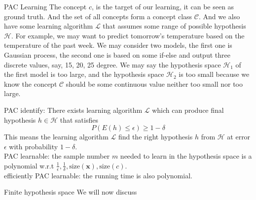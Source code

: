 \documentclass{beamer}
\newcommand{\x}{\mathbf{x}}
\begin{document}
\begin{frame}[allowframebreaks]{PAC Learning}
The concept $c$, is the target of our learning, it can be seen as ground truth. And the set of all concepts form a concept class $\mathcal{C}$. And we also have some learning algorithm $\mathcal{L}$ that assumes some range of possible hypothesis $\mathcal{H}$. For example, we may want to predict tomorrow's temperature based on the temperature of the past week. We may consider two models, the first one is Gaussian process, the second one is based on some if-else and output three discrete values, say, 15, 20, 25 degree. We may say the hypothesis space $\mathcal{H}_1$ of the first model is too large, and the hypothesis space $\mathcal{H}_2$ is too small because we know the concept $\mathcal{C}$ should be some continuous value neither too small nor too large.

\framebreak

PAC identify:
There exists learning algorithm $\mathcal{L}$ which can produce final hypothesis $h\in \mathcal{H}$ that satisfies
$$P(E(h) \le \epsilon) \ge 1 - \delta$$
This means the learning algorithm $\mathcal{L}$ find the right hypothesis $h$ from $\mathcal{H}$ at error $\epsilon$ with probability $1 - \delta$. \\
PAC learnable: the sample number $m$ needed to learn in the hypothesis space is a polynomial w.r.t $\frac{1}{\epsilon}, \frac{1}{\delta}, \text{size}(\x), \text{size}(c)$. \\
efficiently PAC learnable: the running time is also polynomial.
\end{frame}

\begin{frame}[allowframebreaks]{Finite hypothesis space}
We will now discuss
\end{frame}
\end{document}
